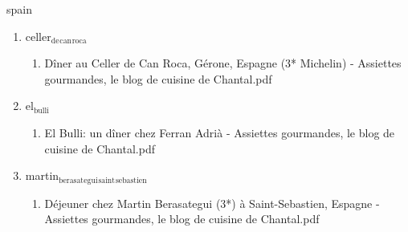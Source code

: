 \documentclass[11pt]{article}
\begin{document}
\item spain
\label{sec-1-1-1-1-21-10-7}
\begin{enumerate}
\item celler$_{\text{de}}$$_{\text{can}}$$_{\text{roca}}$
\label{sec-1-1-1-1-21-10-7-1}
\begin{enumerate}
\item Dîner au Celler de Can Roca, Gérone, Espagne (3* Michelin) - Assiettes gourmandes, le blog de cuisine de Chantal.pdf
\label{sec-1-1-1-1-21-10-7-1-1}
\end{enumerate}

\item el$_{\text{bulli}}$
\label{sec-1-1-1-1-21-10-7-2}
\begin{enumerate}
\item El Bulli: un dîner chez Ferran Adrià - Assiettes gourmandes, le blog de cuisine de Chantal.pdf
\label{sec-1-1-1-1-21-10-7-2-1}
\end{enumerate}

\item martin$_{\text{berasategui}}$$_{\text{saint}}$$_{\text{sebastien}}$
\label{sec-1-1-1-1-21-10-7-3}
\begin{enumerate}
\item Déjeuner chez Martin Berasategui (3*) à Saint-Sebastien, Espagne - Assiettes gourmandes, le blog de cuisine de Chantal.pdf
\label{sec-1-1-1-1-21-10-7-3-1}
\end{enumerate}
\end{enumerate}
\end{document}
